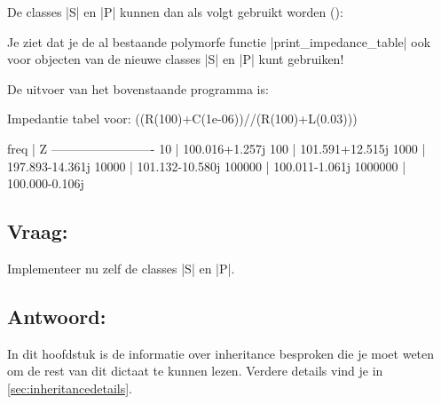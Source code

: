 \begin{cpplstShortInline}
De classes |S| en |P| kunnen dan als volgt gebruikt worden ():

Je ziet dat je de al bestaande polymorfe functie |print_impedance_table| ook voor objecten van de nieuwe classes |S| en |P| kunt gebruiken!

De uitvoer van het bovenstaande programma is:
\begin{coutput}
Impedantie tabel voor: ((R(100)+C(1e-06))//(R(100)+L(0.03)))

   freq | Z
-------------------------
     10 | 100.016+1.257j
    100 | 101.591+12.515j
   1000 | 197.893-14.361j
  10000 | 101.132-10.580j
 100000 | 100.011-1.061j
1000000 | 100.000-0.106j
\end{coutput}

\subsection*{Vraag:}
Implementeer nu zelf de classes |S| en |P|.

\subsection*{Antwoord:}
\vspace{-.4\baselineskip}

%
%

In dit hoofdstuk is de informatie over inheritance besproken die je moet weten om de rest van dit dictaat te kunnen lezen. Verdere details vind je in \cref{sec:inheritancedetails}.


\end{cpplstShortInline}
